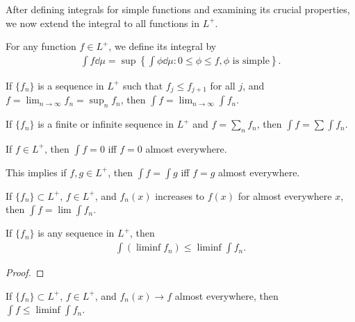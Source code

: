 After defining integrals for simple functions and examining its crucial properties, we now extend the integral to all functions in $L^+$.

\begin{definition}
    For any function $f \in L^+$, we define its integral by
    \begin{align}
        \int f \dd \mu = \sup \left\{ \int \phi \dd \mu: 0 \le \phi \le f, \phi \text{ is simple} \right\}.
    \end{align}
\end{definition}

\begin{theorem}
    If $\{ f_n \}$ is a sequence in $L^+$ such that $f_j \le f_{j+1}$ for all $j$, and $f = \lim_{n \to \infty} f_n = \sup_{n} f_n$, then $\int f = \lim_{n \to \infty} \int f_n$.
\end{theorem}

\begin{theorem}
    If $\{ f_n \}$ is a finite or infinite sequence in $L^+$ and $f = \sum_{n} f_n$, then $\int f = \sum \int f_n$.
\end{theorem}

\begin{proposition}
    If $f \in L^+$, then $\int f = 0$ iff $f = 0$ almost everywhere.
\end{proposition}

This implies if $f, g \in L^+$, then $\int f = \int g$ iff $f = g$ almost everywhere.

\begin{corollary}
    If $\{ f_n \} \subset L^+$, $f \in L^+$, and $f_n(x)$ increases to $f(x)$ for almost everywhere $x$, then $\int f = \lim \int f_n$.
\end{corollary}

\begin{lemma}
    If $\{ f_n \}$ is any sequence in $L^+$, then 
    \begin{align}
        \int (\liminf f_n) \le \liminf \int f_n.
    \end{align}
\end{lemma}

\begin{proof}
    
\end{proof}

\begin{corollary}
    If $\{ f_n \} \subset L^+$, $f \in L^+$, and $f_n(x) \to f$ almost everywhere, then $\int f \le \liminf \int f_n$.
\end{corollary}

